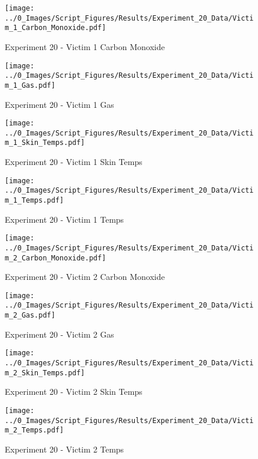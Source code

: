 	\begin{figure}[H]
		\centering
		\texttt{[image: ../0\_Images/Script\_Figures/Results/Experiment\_20\_Data/Victim\_1\_Carbon\_Monoxide.pdf]}
		\caption[]{Experiment 20 - Victim 1 Carbon Monoxide}
	\end{figure}
 
	\clearpage

	\begin{figure}[H]
		\centering
		\texttt{[image: ../0\_Images/Script\_Figures/Results/Experiment\_20\_Data/Victim\_1\_Gas.pdf]}
		\caption[]{Experiment 20 - Victim 1 Gas}
	\end{figure}
 

	\begin{figure}[H]
		\centering
		\texttt{[image: ../0\_Images/Script\_Figures/Results/Experiment\_20\_Data/Victim\_1\_Skin\_Temps.pdf]}
		\caption[]{Experiment 20 - Victim 1 Skin Temps}
	\end{figure}
 
	\clearpage

	\begin{figure}[H]
		\centering
		\texttt{[image: ../0\_Images/Script\_Figures/Results/Experiment\_20\_Data/Victim\_1\_Temps.pdf]}
		\caption[]{Experiment 20 - Victim 1 Temps}
	\end{figure}
 

	\begin{figure}[H]
		\centering
		\texttt{[image: ../0\_Images/Script\_Figures/Results/Experiment\_20\_Data/Victim\_2\_Carbon\_Monoxide.pdf]}
		\caption[]{Experiment 20 - Victim 2 Carbon Monoxide}
	\end{figure}
 
	\clearpage

	\begin{figure}[H]
		\centering
		\texttt{[image: ../0\_Images/Script\_Figures/Results/Experiment\_20\_Data/Victim\_2\_Gas.pdf]}
		\caption[]{Experiment 20 - Victim 2 Gas}
	\end{figure}
 

	\begin{figure}[H]
		\centering
		\texttt{[image: ../0\_Images/Script\_Figures/Results/Experiment\_20\_Data/Victim\_2\_Skin\_Temps.pdf]}
		\caption[]{Experiment 20 - Victim 2 Skin Temps}
	\end{figure}
 
	\clearpage

	\begin{figure}[H]
		\centering
		\texttt{[image: ../0\_Images/Script\_Figures/Results/Experiment\_20\_Data/Victim\_2\_Temps.pdf]}
		\caption[]{Experiment 20 - Victim 2 Temps}
	\end{figure}
 

